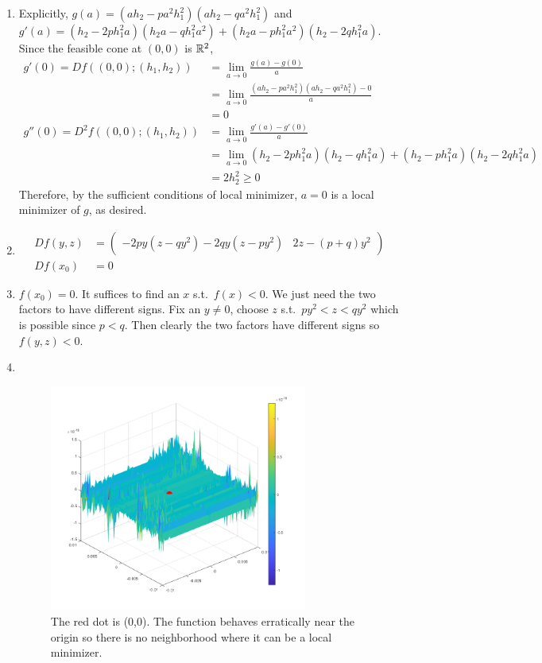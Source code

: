 \documentclass[12pt]{article}
\begin{document}
\begin{problem}[9]
\begin{enumerate}[label=(\alph*)]
	\item Explicitly, $ g(a) = (ah_2-pa^2h_1^2)(ah_2-qa^2h_1^2)$ and $ g'(a) = (h_2-2ph_1^2a)(h_2a-qh_1^2a^2)+(h_2a-ph_1^2a^2)(h_2-2qh_1^2a)$. Since the feasible cone at $ (0,0)$ is  $ \mathbb{R}^2$,
	\begin{align*}
		g'(0)=Df((0,0);(h_1,h_2)) &= \lim_{ a \to 0} \frac{g(a)-g(0)}{ a} \\
		&= \lim_{ a \to 0} \frac{(ah_2-pa^2h_1^2)(ah_2-qa^2h_1^2)-0}{ a} \\
		&=0  \\
		g''(0) = D^2f((0,0);(h_1,h_2)) &= \lim_{ a \to 0} \frac{g'(a)-g'(0)}{ a} \\
		&= \lim_{ a \to 0} (h_2-2ph_1^2 a)(h_2-qh_1^2a) + (h_2-ph_1^2a)(h_2-2qh_1^2 a) \\
		&= 2h_2^2  \geq 0
	\end{align*}
	Therefore, by the sufficient conditions of local minimizer, $ a=0$ is a local minimizer of  $ g$, as desired.
\item 
	\begin{align*}
		Df(y,z)&= \begin{pmatrix} -2py(z-qy^2)-2qy(z-py^2)& 2z-(p+q)y^2 \end{pmatrix}  \\
		Df(x_0) &= 0 
	\end{align*}
\item $ f(x_0) = 0$. It suffices to find an $ x$  s.t.\ $ f(x)<0$. We just need the two factors to have different signs. Fix an $ y\neq 0$, choose  $ z$  s.t.\ $ py^2<z<qy^2$ which is possible since $ p<q$. Then clearly the two factors have different signs so $ f(y,z)<0$.
\item 
~\begin{figure}[H]
	\centering
	\includegraphics[width=0.8\textwidth]{./figures/hw01_plot.png}
	\caption{The red dot is (0,0). The function behaves erratically near the origin so there is no neighborhood where it can be a local minimizer.}
\end{figure}
\end{enumerate}
\end{problem}
\end{document}
